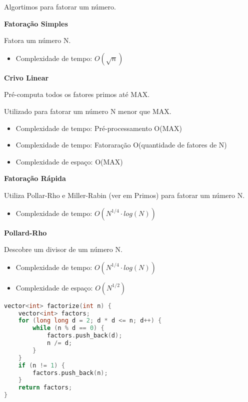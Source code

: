 \documentclass[11pt, a4paper, oneside]{book}
\begin{document}
Algortimos para fatorar um número.



\textbf{Fatoração Simples} 

Fatora um número N.



\begin{itemize}
\item Complexidade de tempo: $O(\sqrt n )$
\end{itemize}



\textbf{Crivo Linear} 

Pré-computa todos os fatores primos até MAX.

Utilizado para fatorar um número N menor que MAX.



\begin{itemize}
\item Complexidade de tempo: Pré-processamento O(MAX)
\item Complexidade de tempo: Fatoraração O(quantidade de fatores de N)
\item Complexidade de espaço: O(MAX)
\end{itemize}



\textbf{Fatoração Rápida} 

Utiliza Pollar-Rho e Miller-Rabin (ver em Primos) para fatorar um número N.



\begin{itemize}
\item Complexidade de tempo: $O(N^{1/4} \cdot log(N))$
\end{itemize}



\textbf{Pollard-Rho} 

Descobre um divisor de um número N.



\begin{itemize}
\item Complexidade de tempo: $O(N^{1/4} \cdot log(N))$
\item Complexidade de espaço: $O(N^{1/2})$
\end{itemize}

\hfill

\begin{multicols}{2}
\begin{lstlisting}[language=C++]
vector<int> factorize(int n) {
    vector<int> factors;
    for (long long d = 2; d * d <= n; d++) {
        while (n % d == 0) {
            factors.push_back(d);
            n /= d;
        }
    }
    if (n != 1) {
        factors.push_back(n);
    }
    return factors;
}
\end{lstlisting}
\end{multicols}
\end{document}
